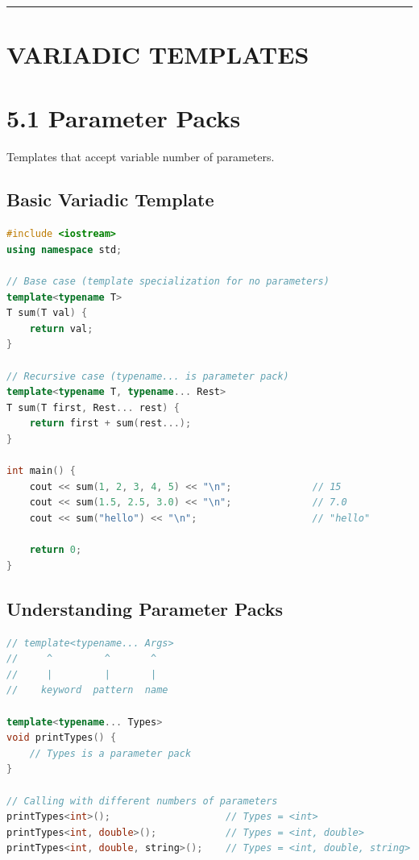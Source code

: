 \begin{center}\rule{0.5\linewidth}{0.5pt}\end{center}

\hypertarget{variadic-templates}{%
\section{VARIADIC TEMPLATES}\label{variadic-templates}}

\hypertarget{parameter-packs}{%
\section{5.1 Parameter Packs}\label{parameter-packs}}

Templates that accept variable number of parameters.

\hypertarget{basic-variadic-template}{%
\subsection{Basic Variadic Template}\label{basic-variadic-template}}

\begin{lstlisting}[language={C++}]
#include <iostream>
using namespace std;

// Base case (template specialization for no parameters)
template<typename T>
T sum(T val) {
    return val;
}

// Recursive case (typename... is parameter pack)
template<typename T, typename... Rest>
T sum(T first, Rest... rest) {
    return first + sum(rest...);
}

int main() {
    cout << sum(1, 2, 3, 4, 5) << "\n";              // 15
    cout << sum(1.5, 2.5, 3.0) << "\n";              // 7.0
    cout << sum("hello") << "\n";                    // "hello"

    return 0;
}
\end{lstlisting}

\hypertarget{understanding-parameter-packs}{%
\subsection{Understanding Parameter
Packs}\label{understanding-parameter-packs}}

\begin{lstlisting}[language={C++}]
// template<typename... Args>
//     ^         ^       ^
//     |         |       |
//    keyword  pattern  name

template<typename... Types>
void printTypes() {
    // Types is a parameter pack
}

// Calling with different numbers of parameters
printTypes<int>();                    // Types = <int>
printTypes<int, double>();            // Types = <int, double>
printTypes<int, double, string>();    // Types = <int, double, string>
\end{lstlisting}

